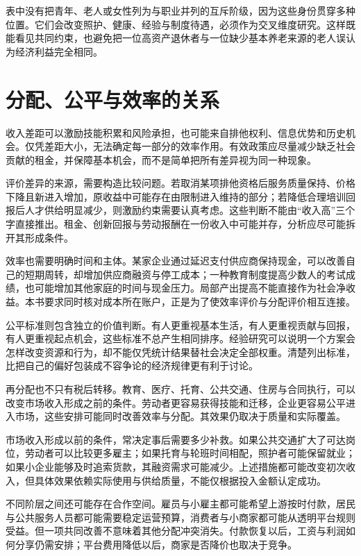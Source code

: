 \documentclass[UTF8,fontset=fandol,zihao=-4,oneside,openany]{ctexbook}
\begin{document}
表中没有把青年、老人或女性列为与职业并列的互斥阶级，因为这些身份贯穿多种位置。它们会改变照护、健康、经验与制度待遇，必须作为交叉维度研究。这样既能看见共同约束，也避免把一位高资产退休者与一位缺少基本养老来源的老人误认为经济利益完全相同。

\section{分配、公平与效率的关系}
收入差距可以激励技能积累和风险承担，也可能来自排他权利、信息优势和历史机会。仅凭差距大小，无法确定每一部分的效率作用。有效政策应尽量减少缺乏社会贡献的租金，并保障基本机会，而不是简单把所有差异视为同一种现象。

\label{arg:P175}
评价差异的来源，需要构造比较问题。若取消某项排他资格后服务质量保持、价格下降且新进入增加，原收益中可能存在由限制进入维持的部分；若降低合理培训回报后人才供给明显减少，则激励约束需要认真考虑。这些判断不能由“收入高”三个字直接推出。租金、创新回报与劳动报酬在一份收入中可能并存，分析应尽可能拆开其形成条件。

效率也需要明确时间和主体。某家企业通过延迟支付供应商保持现金，可以改善自己的短期周转，却增加供应商融资与停工成本；一种教育制度提高少数人的考试成绩，也可能增加其他家庭的时间与现金压力。局部产出提高不能直接作为社会净收益。本书要求同时核对成本所在账户，正是为了使效率评价与分配评价相互连接。

公平标准则包含独立的价值判断。有人更重视基本生活，有人更重视贡献与回报，有人更重视起点机会，这些标准不总产生相同排序。经验研究可以说明一个方案会怎样改变资源和行为，却不能仅凭统计结果替社会决定全部权重。清楚列出标准，比把自己的偏好包装成不容争论的经济规律更有利于讨论。

再分配也不只有税后转移。教育、医疗、托育、公共交通、住房与合同执行，可以改变市场收入形成之前的条件。劳动者更容易获得技能和迁移，企业更容易公平进入市场，这些安排可能同时改善效率与分配。其效果仍取决于质量和实际覆盖。

\label{arg:P176}
市场收入形成以前的条件，常决定事后需要多少补救。如果公共交通扩大了可达岗位，劳动者可以比较更多雇主；如果托育与轮班时间相配，照护者可能保留就业；如果小企业能够及时追索货款，其融资需求可能减少。上述措施都可能改变初次收入，但具体效果依赖实际使用与供给质量，不能仅根据投入金额认定成功。

不同阶层之间还可能存在合作空间。雇员与小雇主都可能希望上游按时付款，居民与公共服务人员都可能需要稳定运营预算，消费者与小商家都可能从透明平台规则受益。但一项共同改善不意味着其他分配冲突消失。付款恢复以后，工资与利润如何分享仍需安排；平台费用降低以后，商家是否降价也取决于竞争。
\end{document}
